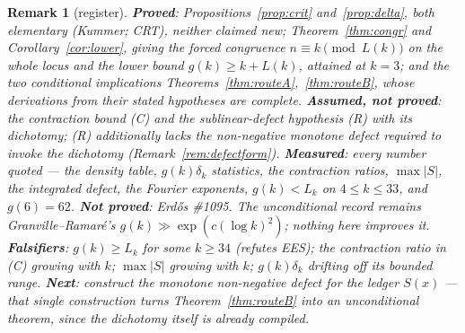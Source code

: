 \documentclass[11pt]{article}
\newtheorem{remark}[theorem]{Remark}
\begin{document}
\begin{remark}[register]
\textbf{Proved}: Propositions~\ref{prop:crit} and~\ref{prop:delta}, both elementary (Kummer;
CRT), neither claimed new; Theorem~\ref{thm:congr} and Corollary~\ref{cor:lower}, giving the
forced congruence $n\equiv k\pmod{L(k)}$ on the whole locus and the lower bound
$g(k)\ge k+L(k)$, attained at $k=3$; and the two conditional implications
Theorems~\ref{thm:routeA},~\ref{thm:routeB}, whose derivations from their stated hypotheses
are complete.  \textbf{Assumed, not proved}: the contraction bound \textup{(C)} and the
sublinear-defect hypothesis \textup{(R)} with its dichotomy; \textup{(R)} additionally lacks
the non-negative monotone defect required to invoke the dichotomy
(Remark~\ref{rem:defectform}).  \textbf{Measured}: every number quoted --- the density table,
$g(k)\delta_k$ statistics, the contraction ratios, $\max|S|$, the integrated defect, the
Fourier exponents, $g(k)<L_k$ on $4\le k\le33$, and $g(6)=62$.  \textbf{Not proved}:
Erd\H{o}s \#1095.  The unconditional record remains Granville--Ramar\'e's
$g(k)\gg\exp(c(\log k)^{2})$; nothing here improves it.
\textbf{Falsifiers}: $g(k)\ge L_k$ for some $k\ge34$ (refutes EES); the contraction ratio in
\textup{(C)} growing with $k$; $\max|S|$ growing with $k$; $g(k)\delta_k$ drifting off its
bounded range.  \textbf{Next}: construct the monotone non-negative defect for the ledger
$S(x)$ --- that single construction turns Theorem~\ref{thm:routeB} into an unconditional
theorem, since the dichotomy itself is already compiled.
\end{remark}
\end{document}
